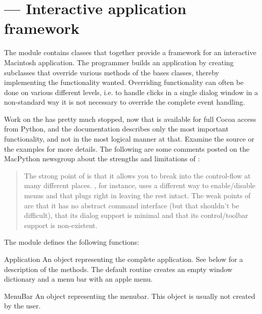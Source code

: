 \section{ ---
         Interactive application framework}



The  module contains classes that together provide a
framework for an interactive Macintosh application. The programmer
builds an application by creating subclasses that override various
methods of the bases classes, thereby implementing the functionality
wanted. Overriding functionality can often be done on various
different levels, i.e. to handle clicks in a single dialog window in a
non-standard way it is not necessary to override the complete event
handling.

Work on the  has pretty much stopped, now that
 is available for full Cocoa access from Python, and the
documentation describes only the most important functionality, and not
in the most logical manner at that. Examine the source or the examples
for more details.  The following are some comments posted on the
MacPython newsgroup about the strengths and limitations of
:

\begin{quotation}
The strong point of  is that it allows you to break
into the control-flow at many different places. , for
instance, uses a different way to enable/disable menus and that plugs
right in leaving the rest intact.  The weak points of
 are that it has no abstract command interface (but
that shouldn't be difficult), that its dialog support is minimal and
that its control/toolbar support is non-existent.
\end{quotation}


The  module defines the following functions:


\begin{funcdesc}{Application}{}
An object representing the complete application. See below for a
description of the methods. The default  routine
creates an empty window dictionary and a menu bar with an apple menu.
\end{funcdesc}

\begin{funcdesc}{MenuBar}{}
An object representing the menubar. This object is usually not created
by the user.
\end{funcdesc}

